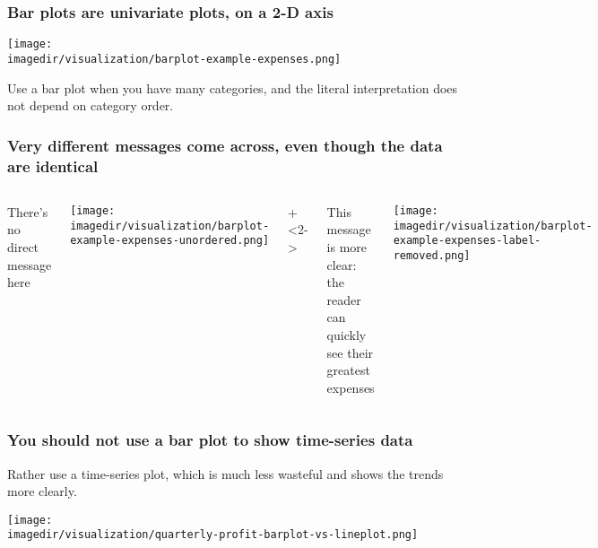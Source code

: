 \begin{frame}\frametitle{Bar plots are univariate plots, on a 2-D axis}
	\centerline{\texttt{[image: \\imagedir/visualization/barplot-example-expenses.png]}}
	\vspace{-8pt}
	
	\pause
	{\color{myOrange}Use a bar plot when you have many categories, and the literal interpretation does not depend on category order.}
\end{frame}

\begin{frame}\frametitle{Very different messages come across, even though the data are identical}
	\begin{columns}[b]
		
			There's no direct message here 
			
			\vspace{12pt}
			\centerline{\texttt{[image: \\imagedir/visualization/barplot-example-expenses-unordered.png]}}
			
		
			\onslide+<2->{
			This message is more clear: the reader can quickly see their greatest expenses 
			
			\vspace{12pt}
			\centerline{\texttt{[image: \\imagedir/visualization/barplot-example-expenses-label-removed.png]}}
			}
		
	\end{columns}
\end{frame}

\begin{frame}\frametitle{You should not use a bar plot to show time-series data}
	
	Rather use a time-series plot, which is much less wasteful and shows the trends more clearly.
	\begin{center}
		\texttt{[image: \\imagedir/visualization/quarterly-profit-barplot-vs-lineplot.png]}
	\end{center}
\end{frame}

